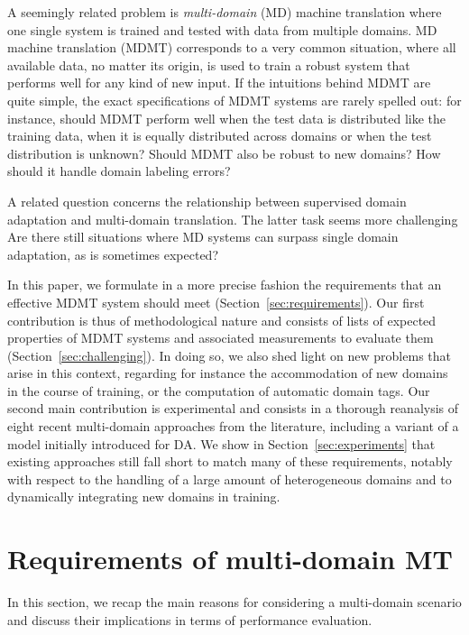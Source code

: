 A seemingly related problem is \emph{multi-domain} (MD) machine translation \cite{Sajjad17neural,Farajian17multidomain,Kobus17domain,Zeng18multidomain,Pham19generic} where one single system is trained and tested with data from multiple domains. MD machine translation (MDMT) corresponds to a very common situation, where all available data, no matter its origin, is used to train a robust system that performs well for any kind of new input.
If the intuitions behind MDMT are quite simple, the exact specifications of MDMT systems are rarely spelled out: for instance, should MDMT perform well when the test data is distributed like the training data, when it is equally distributed across domains or when the test distribution is unknown? Should MDMT also be robust to new domains? How should it handle domain labeling errors? 

A related question concerns the relationship between supervised domain adaptation and multi-domain translation. The latter task seems more challenging  Are there still situations where MD systems can surpass single domain adaptation, as is sometimes expected?   

In this paper, we formulate in a more precise fashion the requirements that an effective MDMT system should meet (Section~\ref{sec:requirements}). Our first contribution is thus of methodological nature and consists of lists of expected properties of MDMT systems and associated measurements to evaluate them (Section~\ref{sec:challenging}). In doing so, we also shed light on new problems that arise in this context, regarding for instance the accommodation of new domains in the course of training, or the computation of automatic domain tags. Our second main contribution is experimental and consists in a thorough reanalysis of eight recent multi-domain approaches from the literature, including a variant of a model initially introduced for DA. We show in Section~\ref{sec:experiments} that existing approaches still fall short to match many of these requirements, notably with respect to the handling of a large amount of heterogeneous domains and to dynamically integrating new domains in training.
 
\section{Requirements of multi-domain MT \label{sec:requirements}}
In this section, we recap the main reasons for considering a multi-domain scenario and discuss their implications in terms of performance evaluation.

